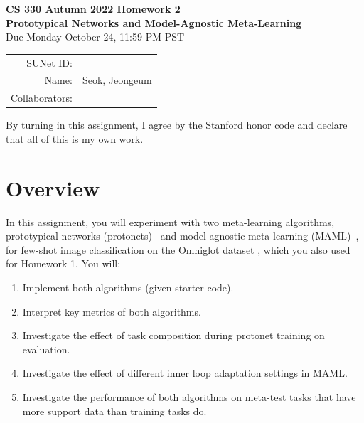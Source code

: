 \documentclass[12pt]{article}
\begin{document}
\begin{center}
{{\Large \textbf{CS 330 Autumn 2022 Homework 2 \\ Prototypical Networks and Model-Agnostic Meta-Learning}}
\\ {\large Due Monday October 24, 11:59 PM PST}}

\begin{tabular}{rl}
SUNet ID: &  \\
Name: &Seok, Jeongeum\\
Collaborators: & 
\end{tabular}
\end{center}

By turning in this assignment, I agree by the Stanford honor code and declare that all of this is my own work.

\section*{Overview}

In this assignment, you will experiment with two meta-learning algorithms, prototypical networks (protonets)~\cite{prototypical} and model-agnostic meta-learning (MAML)~\cite{maml}, for few-shot image classification on the Omniglot dataset \cite{Lake1332}, which you also used for Homework 1. You will:
\begin{enumerate}
    \item Implement both algorithms (given starter code).
    \item Interpret key metrics of both algorithms.
    \item Investigate the effect of task composition during protonet training on evaluation.
    \item Investigate the effect of different inner loop adaptation settings in MAML.
    \item Investigate the performance of both algorithms on meta-test tasks that have more support data than training tasks do.
\end{enumerate}
\end{document}
